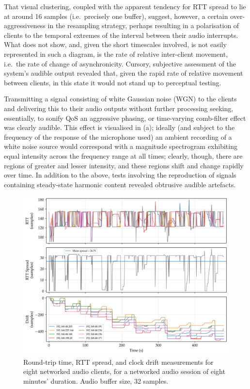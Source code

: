 That visual clustering, coupled with the apparent tendency for RTT spread to
lie at around 16 samples (i.e.\ precisely one buffer), suggest, however, a
certain over-aggressiveness in the resampling strategy, perhaps resulting in a
polarisation of clients to the temporal extremes of the interval between their
audio interrupts.
What  does not show, and, given the short timescales
involved, is not easily represented in such a diagram, is the rate of relative
inter-client movement, i.e.\ the rate of change of asynchronicity.
Cursory, subjective assessment of the system's audible output revealed that,
given the rapid rate of relative movement between clients, in this state it
would not stand up to perceptual testing.

Transmitting a signal consisting of white Gaussian noise (WGN) to the clients
and delivering this to their audio outputs without further processing
\textemdash{} seeking, essentially, to sonify QoS \textemdash{} an
aggressive phasing, or time-varying comb-filter effect was clearly audible.
This effect is visualised in (a); ideally (and
subject to the frequency of the response of the microphone used) an ambient
recording of a white noise source would correspond with a magnitude spectrogram
exhibiting equal intensity across the frequency range at all times; clearly,
though, there are regions of greater and lesser intensity, and these regions
shift and change rapidly over time.
In addition to the above, tests involving the reproduction of signals
containing steady-state harmonic content revealed obtrusive audible artefacts.

\begin{figure}[ht]
    \centering
    \includegraphics[width=\textwidth]{figures/rtt_drift_32}
    \caption{
        Round-trip time, RTT spread, and clock drift measurements
        for eight networked audio clients, for a networked audio session of
        eight minutes' duration.
        Audio buffer size, 32 samples.
    }
    \label{fig:rtt-drift-32}
\end{figure}

